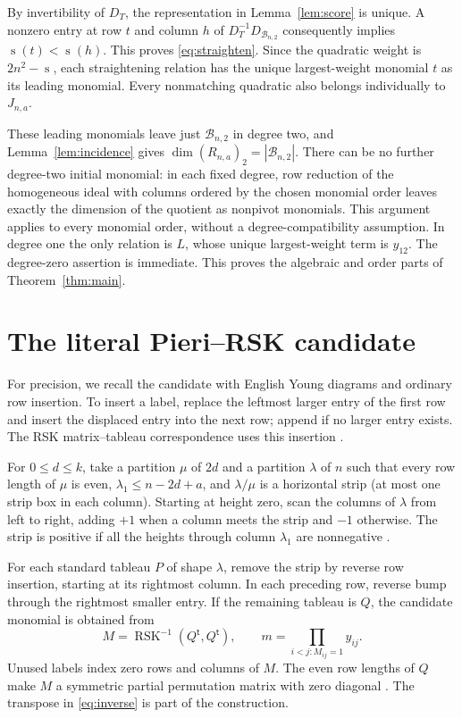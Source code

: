 \documentclass[11pt,a4paper]{article}
\newcommand{\BB}{\mathcal{B}_{n,2}}
\DeclareMathOperator{\RSK}{RSK}
\DeclareMathOperator{\score}{s}
\begin{document}
By invertibility of $D_T$, the representation in Lemma~\ref{lem:score}
is unique. A nonzero entry at row $t$ and column $h$ of
$D_T^{-1}D_{\BB}$ consequently implies $\score(t)<\score(h)$.
This proves \eqref{eq:straighten}. Since the quadratic weight is
$2n^2-\score$, each straightening relation has the unique largest-weight
monomial $t$ as its leading monomial. Every nonmatching quadratic also
belongs individually to $J_{n,a}$.

These leading monomials leave just $\BB$ in degree two, and
Lemma~\ref{lem:incidence} gives
$\dim(R_{n,a})_2=|\BB|$. There can be no further degree-two initial
monomial: in each fixed degree, row reduction of the homogeneous ideal
with columns ordered by the chosen monomial order leaves exactly the
dimension of the quotient as nonpivot monomials. This argument applies
to every monomial order, without a degree-compatibility assumption.
In degree one the only relation is $L$, whose unique largest-weight term
is $y_{12}$. The degree-zero assertion is immediate. This proves the
algebraic and order parts of Theorem~\ref{thm:main}.

\section{The literal Pieri--RSK candidate}\label{sec:tableaux}

For precision, we recall the candidate with English Young diagrams and
ordinary row insertion. To insert a label, replace the leftmost larger
entry of the first row and insert the displaced entry into the next row;
append if no larger entry exists. The RSK matrix--tableau correspondence
uses this insertion \cite[Sections 2--4]{Knuth}.

For $0\leq d\leq k$, take a partition $\mu$ of $2d$ and a partition $\lambda$ of $n$
such that every row length of $\mu$ is even,
$\lambda_1\leq n-2d+a$, and $\lambda/\mu$ is a horizontal strip
(at most one strip box in each column). Starting at height zero, scan
the columns of $\lambda$ from left to right, adding $+1$ when a column
meets the strip and $-1$ otherwise. The strip is positive if all the
heights through column $\lambda_1$ are nonnegative
\cite[Definition 5 and equation (4)]{ZhuPositive}.

For each standard tableau $P$ of shape $\lambda$, remove the strip by
reverse row insertion, starting at its rightmost column. In each preceding
row, reverse bump through the rightmost smaller entry. If the remaining
tableau is $Q$, the candidate monomial is obtained from
\begin{equation}\label{eq:inverse}
 M=\RSK^{-1}(Q^{\mathsf t},Q^{\mathsf t}),\qquad
 m=\prod_{i<j:M_{ij}=1}y_{ij}.
\end{equation}
Unused labels index zero rows and columns of $M$. The even row lengths
of $Q$ make $M$ a symmetric partial permutation matrix with zero diagonal
\cite[Proposition 2]{ZhuPositive}. The transpose in \eqref{eq:inverse}
is part of the construction.
\end{document}
